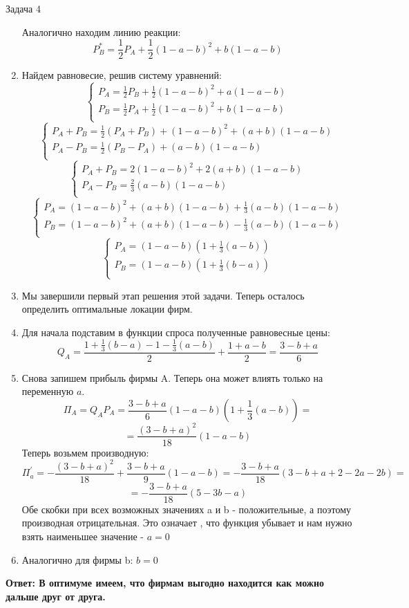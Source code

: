 \begin{mybox}{Задача 4}
\begin{enumerate}
        Аналогично находим линию реакции: $$P_B^*=\frac{1}{2}P_A+\frac{1}{2}(1-a-b)
        ^2+b(1-a-b)$$
        \item Найдем равновесие, решив систему уравнений:
        $$\begin{cases}
              P_A=\frac{1}{2}P_B+\frac{1}{2}(1-a-b)^2+a(1-a-b) \\
              P_B=\frac{1}{2}P_A+\frac{1}{2}(1-a-b)^2+b(1-a-b) \\
        \end{cases}$$
        $$\begin{cases}
              P_A+P_B=\frac{1}{2}(P_A+P_B)+(1-a-b)^2+(a+b)(1-a-b) \\
              P_A-P_B=\frac{1}{2}(P_B-P_A)+(a-b)(1-a-b) \\
        \end{cases}$$
        $$\begin{cases}
              P_A+P_B=2(1-a-b)^2+2(a+b)(1-a-b) \\
              P_A-P_B=\frac{2}{3}(a-b)(1-a-b) \\
        \end{cases}$$
        $$\begin{cases}
              P_A=(1-a-b)^2+(a+b)(1-a-b)+\frac{1}{3}(a-b)(1-a-b) \\
              P_B=(1-a-b)^2+(a+b)(1-a-b)-\frac{1}{3}(a-b)(1-a-b) \\
        \end{cases}$$
        $$\begin{cases}
              P_A=(1-a-b)(1+\frac{1}{3}(a-b)) \\
              P_B=(1-a-b)(1+\frac{1}{3}(b-a)) \\
        \end{cases}$$
        \item Мы завершили первый этап решения этой задачи. Теперь осталось определить оптимальные локации фирм.
        \item Для начала подставим в функции спроса полученные равновесные цены:
        $$Q_A=\frac{1+\frac{1}{3}(b-a)-1-\frac{1}{3}(a-b)}{2}+\frac{1+a-b}{2}=\frac{3-b+a}{6}$$
        \item Снова запишем прибыль фирмы A. Теперь она может влиять только на переменную $a$.
        $$\Pi_A=Q_AP_A=\frac{3-b+a}{6}(1-a-b)(1+\frac{1}{3}(a-b))=$$
        $$=\frac{(3-b+a)^2}{18}(1-a-b)$$
        Теперь возьмем производную:
        $$\Pi_a^{'}=-\frac{(3-b+a)^2}{18}+\frac{3-b+a}{9}(1-a-b)=-\frac{3-b+a}{18}(3-b+a+2-2a-2b)=$$
        $$=-\frac{3-b+a}{18}(5-3b-a)$$
        Обе скобки при всех возможных значениях a и b - положительные, а поэтому производная отрицательная. Это означает
        , что функция убывает и нам нужно взять наименьшее значение - $a=0$
        \item Аналогично для фирмы b: $b=0$
    \end{enumerate}
    \textbf{Ответ: В оптимуме имеем, что фирмам выгодно находится как можно дальше друг от друга.}
\end{mybox}

